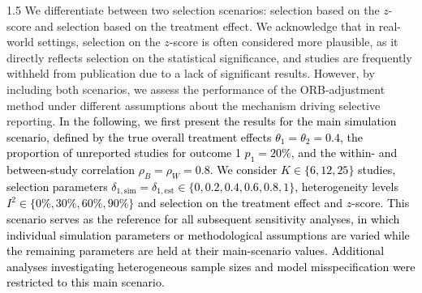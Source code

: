 \documentclass{article}
\newcommand{\mycolor}[1]{\textcolor{black}{#1}}
\begin{document}
\begin{spacing}{1.5}
We differentiate between two selection scenarios: selection based on the $z$-score and selection based on the treatment effect. We acknowledge that in real-world settings, selection on the $z$-score is often considered more plausible, as it directly reflects selection on the statistical significance, and studies are frequently withheld from publication due to a lack of significant results. However, by including both scenarios, we assess the performance of the ORB-adjustment method under different assumptions about the mechanism driving selective reporting. \mycolor{In the following, we first present the results for the main simulation scenario, defined by the true overall treatment effects $\theta_1 = \theta_2 = 0.4$, the proportion of unreported studies for outcome 1 $p_1 = 20\%$, and the within- and between-study correlation $\rho_B = \rho_W = 0.8$. We consider $K \in \{6, 12, 25\}$ studies, selection parameters $\delta_{1, \text{sim}} = \delta_{1, \text{est}} \in \{0, 0.2, 0.4, 0.6, 0.8, 1\}$,  heterogeneity levels $I^2 \in \{0\%, 30\%, 60\%, 90\%\}$ and selection on the treatment effect and $z$-score. This scenario serves as the reference for all subsequent sensitivity analyses, in which individual simulation parameters or methodological assumptions are varied while the remaining parameters are held at their main-scenario values. Additional analyses investigating heterogeneous sample sizes and model misspecification were restricted to this main scenario.}


\end{spacing}
\end{document}
